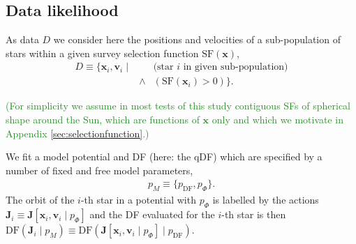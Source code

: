 \documentclass[iop,revtex4]{emulateapj}
\newcommand{\vect}[1]{\boldsymbol{#1}}
\newcommand{\pmodel}{\ensuremath{p_M}}
\newcommand{\NEW}[1]{\textcolor{ForestGreen}{#1}}
\begin{document}
\subsection{Data likelihood} %

As data $D$ we consider here the positions and velocities of a sub-population of stars within a given survey selection function $\text{SF}(\vect{x})$,
\begin{eqnarray*}
D  \equiv \{ \vect{x}_i,\vect{v}_i \mid && \text{(star $i$ in given sub-population)}\nonumber\\
&\wedge& (\text{SF}(\vect{x}_i) > 0) \}.
\end{eqnarray*}

\NEW{(For simplicity we assume in most tests of this study contiguous SFs of spherical shape around the Sun, which are functions of $\vect{x}$ only and which we motivate in Appendix \ref{sec:selectionfunction}.)}

We fit a model potential and DF (here: the qDF) which are specified by a number of fixed and free model parameters,
\begin{eqnarray*}
\pmodel \equiv \{ p_\text{DF} , p_\Phi \}.
\end{eqnarray*}
The orbit of the $i$-th star in a potential with $p_\Phi$ is labelled by the actions $\vect{J}_i \equiv \vect{J}[\vect{x}_i,\vect{v}_i\mid p_{\Phi}]$ and the DF evaluated for the $i$-th star is then $\text{DF}(\vect{J}_i \mid \pmodel) \equiv \text{DF}(\vect{J}[\vect{x}_i,\vect{v}_i\mid p_{\Phi}] \mid p_\text{DF})$.
\end{document}

